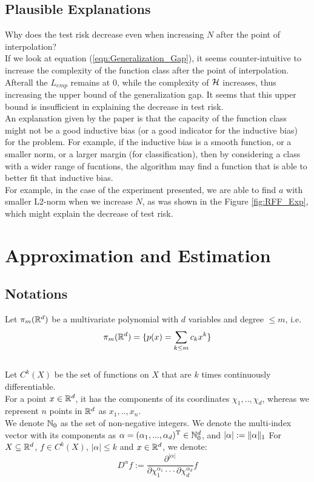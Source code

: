 \documentclass[twoside]{memoir}
\begin{document}
\section{Plausible Explanations}
Why does the test risk decrease even when increasing $N$ after the point of interpolation?\\
If we look at equation (\ref{eqn:Generalization_Gap}), it seems counter-intuitive to increase the complexity of the function class after the point of interpolation. Afterall the $L_{emp}$ remains at 0, while the complexity of $\mathcal{H}$ increases, thus increasing the upper bound of the generalization gap. It seems that this upper bound is insufficient in explaining the decrease in test risk.\\
An explanation given by the paper is that the capacity of the function class might not be a good inductive bias (or a good indicator for the inductive bias) for the problem. For example, if the inductive bias is a smooth function, or a smaller norm, or a larger margin (for classification), then by considering a class with a wider range of fucntions, the algorithm may find a function that is able to better fit that inductive bias.\\
For example, in the case of the experiment presented, we are able to find $a$ with smaller L2-norm when we increase $N$, as was shown in the Figure \ref{fig:RFF_Exp}, which might explain the decrease of test risk.

\chapter{Approximation and Estimation}
\section{Notations} \label{sec:Notations}

Let $\pi_m(\mathbb{R}^d)$ be a multivariate polynomial with $d$ variables and degree $\leq m$, i.e. 
\[ \pi_m(\mathbb{R}^d) = \{ p(x) = \sum_{k \leq m} c_k x^k \} \] 	
\\
Let $C^k(X)$ be the set of functions on $X$ that are $k$ times continuously differentiable. \\
For a point $x \in \mathbb{R}^d$, it has the components of its coordinates $\chi_1, .., \chi_d$, whereas we represent $n$ points in $\mathbb{R}^d$ as $x_1, .., x_n$.\\
We denote $\mathbb{N}_0$ as the set of non-negative integers.
We denote the multi-index vector with its components as $\alpha = (\alpha_1, ..., \alpha_d)^{\text{T}} \in \mathbb{N}_{0}^{d}$, and $|\alpha| := \lVert\alpha\rVert_1$ For $X \subseteq \mathbb{R}^d$, $f \in C^k(X)$, $|\alpha| \leq k$ and $x \in \mathbb{R}^d$, we denote:
\[ D^\alpha f := \frac{\partial^{|\alpha|}}{\partial\chi_1^{\alpha_1} \cdot\cdot\cdot \partial\chi_d^{\alpha_d}} f \]
\end{document}
